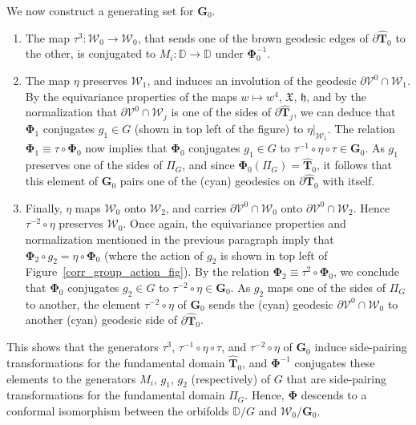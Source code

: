 \documentclass[11pt,a4paper, oneside]{amsart}
\theoremstyle{definition}
\theoremstyle{remark}
\numberwithin{equation}{section}
\def\D{{\mathbb{D}}}
\def\cV{\mathcal {V}}
\def\cW{\mathcal {W}}
\begin{document}
We now construct a generating set for $\pmb{G}_0$.
\begin{enumerate}[leftmargin=8mm]
\item The map $\tau^3 \colon \pmb{\cW}_0\to\pmb{\cW}_0$, that sends one of the brown geodesic edges of $\partial\widehat{\pmb{T}}_0$ to the other, is conjugated to $M_i:\D\to\D$ under $\pmb{\Phi}_0^{-1}$.

\item The map $\eta$ preserves $\pmb{\cW}_1$, and induces an involution of the geodesic $\partial\cV^0\cap\pmb{\cW}_1$. By the equivariance properties of the maps $w\mapsto w^4$, $\mathfrak{X}$, $\mathfrak{h}$, and by the normalization that $\partial\cV^0\cap\pmb{\cW}_j$ is one of the sides of $\partial\widehat{\pmb{T}}_j$, we can deduce that $\pmb{\Phi}_1$ conjugates $g_1\in G$ (shown in top left of the figure) to $\eta\vert_{\pmb{\cW}_1}$. The relation $\pmb{\Phi}_1\equiv \tau\circ\pmb{\Phi}_0$ now implies that $\pmb{\Phi}_0$ conjugates $g_1\in G$ to $\tau^{-1}\circ\eta\circ\tau\in\pmb{G}_0$. As $g_1$ preserves one of the sides of $\Pi_G$, and since $\pmb{\Phi}_0(\Pi_G)=\widehat{\pmb{T}}_0$, it follows that this element of $\pmb{G}_0$ pairs one of the (cyan) geodesics on $\partial\widehat{\pmb{T}}_0$ with itself.

\item Finally, $\eta$ maps $\pmb{\cW}_0$ onto $\pmb{\cW}_2$, and carries $\partial\cV^0\cap\pmb{\cW}_0$ onto $\partial\cV^0\cap\pmb{\cW}_2$.
Hence $\tau^{-2}\circ\eta$ preserves $\pmb{\cW}_0$. Once again, the equivariance properties and normalization mentioned in the previous paragraph imply that $\pmb{\Phi}_2\circ g_2=\eta\circ\pmb{\Phi}_0$ (where the action of $g_2$ is shown in top left of Figure~\ref{corr_group_action_fig}). By the relation $\pmb{\Phi}_2\equiv \tau^2\circ\pmb{\Phi}_0$, we conclude that $\pmb{\Phi}_0$ conjugates $g_2\in G$ to $\tau^{-2}\circ\eta\in\pmb{G}_0$. As $g_2$ maps one of the sides of $\Pi_G$ to another, the element $\tau^{-2}\circ\eta$ of $\pmb{G}_0$ sends the (cyan) geodesic $\partial\cV^0\cap\pmb{\cW}_0$ to another (cyan) geodesic side of $\partial\widehat{\pmb{T}}_0$.
\end{enumerate}

This shows that the generators $\tau^3$, $\tau^{-1}\circ\eta\circ\tau$, and $\tau^{-2}\circ\eta$ of $\pmb{G}_0$ induce side-pairing transformations for the fundamental domain $\widehat{\pmb{T}}_0$, and $\pmb{\Phi}^{-1}$ conjugates these elements to the generators $M_i$, $g_1$, $g_2$ (respectively) of $G$ that are side-pairing transformations for the fundamental domain $\Pi_G$. Hence, $\pmb{\Phi}$ descends to a conformal isomorphism between the orbifolds $\D/G$ and $\pmb{\cW}_0/\pmb{G}_0$.
\end{document}

